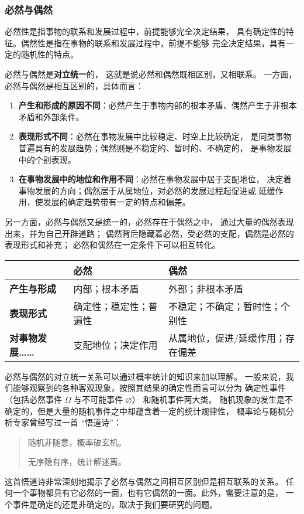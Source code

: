 \documentclass[utf-8, 10pt]{article}
\begin{document}
\subsubsection{必然与偶然}

必然性是指事物的联系和发展过程中，前提能够完全决定结果，
具有确定性的特征。偶然性是指在事物的联系和发展过程中，前提不能够
完全决定结果，具有一定的随机性的特点。

必然与偶然是\textbf{对立统一}的，
这就是说{\kaishu 必然和偶然既相区别，又相联系}。
一方面，必然与偶然是相互区别的，具体而言：
\begin{enumerate}[label={$\left.\arabic*\right)$}, itemsep=0pt]
    \item \textbf{产生和形成的原因不同}：必然产生于事物内部的根本矛盾、偶然产生于非根本
    矛盾和外部条件。
    \item \textbf{表现形式不同}：必然在事物发展中比较稳定、时空上比较确定，
    是同类事物普遍具有的发展趋势；偶然则是不稳定的、暂时的、不确定的，
    是事物发展中的个别表现。
    \item \textbf{在事物发展中的地位和作用不同}：必然在事物发展中居于支配地位，
    决定着事物发展的方向；偶然居于从属地位，对必然的发展过程起促进或
    延缓作用，使发展的确定趋势带有一定的特点和偏差。
\end{enumerate}
另一方面，必然与偶然又是统一的，必然存在于偶然之中，
通过大量的偶然表现出来，并为自己开辟道路；
偶然背后隐藏着必然，受必然的支配，偶然是必然的表现形式和补充；
必然和偶然在一定条件下可以相互转化。

{ %
\label{必然与偶然的区别} %
\begin{longtable}{p{7em}|p{11em}p{16em}}
    \hline
    & \textbf{必然} & \textbf{偶然} \\
    \hline
    \endhead
    \hline
    \endfoot

    \textbf{产生与形成} & 内部；根本矛盾 & 外部；非根本矛盾 \\ 
    \textbf{表现形式} & 确定性；稳定性；普遍性 & 不稳定；不确定；暂时性；个别性 \\ 
    \textbf{对事物发展……} & 支配地位；决定作用 & 从属地位，促进/延缓作用；存在偏差 \\
\end{longtable}}


必然与偶然的对立统一关系可以通过概率统计的知识来加以理解。
一般来说，我们能够观察到的各种客观现象，按照其结果的确定性而言可以分为
确定性事件（包括必然事件 $\varOmega$ 与不可能事件 $\varnothing$）
和随机事件两大类。
随机现象的发生是不确定的，但是大量的随机事件之中却蕴含着一定的统计规律性，
概率论与随机分析专家曾经写过一首 “悟道诗”：
\begin{quote}
    \kaishu
    随机非随意，概率破玄机。

    无序隐有序，统计解迷离。
\end{quote}
这首悟道诗非常深刻地揭示了必然与偶然之间相互区别但是相互联系的关系。
任何一个事物都具有它必然的一面，也有它偶然的一面。此外，需要注意的是，
一个事件是确定的还是非确定的，取决于我们要研究的问题。
\end{document}
